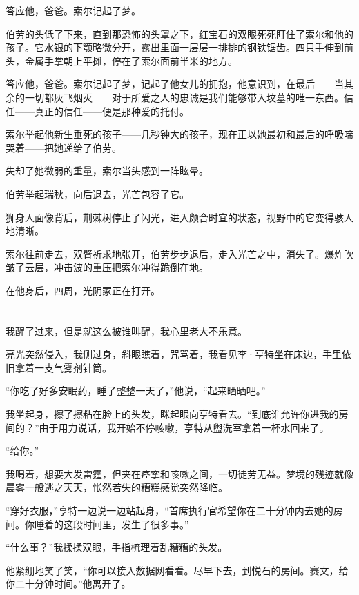\documentclass[AutoFakeBold=true]{book}
\begin{document}
{\kaishu 答应他，爸爸。}索尔记起了梦。

伯劳的头低了下来，直到那恐怖的头罩之下，红宝石的双眼死死盯住了索尔和他的孩子。它水银的下颚略微分开，露出里面一层层一排排的钢铁锯齿。四只手伸到前头，金属手掌朝上平摊，停在了索尔面前半米的地方。

{\kaishu 答应他，爸爸。}索尔记起了梦，记起了他女儿的拥抱，他意识到，在最后——当其余的一切都灰飞烟灭——对于所爱之人的忠诚是我们能够带入坟墓的唯一东西。信任——真正的信任——便是那种爱的托付。

索尔举起他新生垂死的孩子——几秒钟大的孩子，现在正以她最初和最后的呼吸啼哭着——把她递给了伯劳。

失却了她微弱的重量，索尔当头感到一阵眩晕。

伯劳举起瑞秋，向后退去，光芒包容了它。

狮身人面像背后，荆棘树停止了闪光，进入颇合时宜的状态，视野中的它变得骇人地清晰。

索尔往前走去，双臂祈求地张开，伯劳步步退后，走入光芒之中，消失了。爆炸吹皱了云层，冲击波的重压把索尔冲得跪倒在地。

在他身后，四周，光阴冢正在打开。

\part{}

\chapter{}

我醒了过来，但是就这么被谁叫醒，我心里老大不乐意。

亮光突然侵入，我侧过身，斜眼瞧着，咒骂着，我看见李·亨特坐在床边，手里依旧拿着一支气雾剂针筒。

``你吃了好多安眠药，睡了整整一天了，''他说，``起来晒晒吧。''

我坐起身，擦了擦粘在脸上的头发，眯起眼向亨特看去。``到底谁允许你进我的房间的？''由于用力说话，我开始不停咳嗽，亨特从盥洗室拿着一杯水回来了。

``给你。''

我喝着，想要大发雷霆，但夹在痉挛和咳嗽之间，一切徒劳无益。梦境的残迹就像晨雾一般逃之天天，怅然若失的糟糕感觉突然降临。

``穿好衣服，''亨特一边说一边站起身，``首席执行官希望你在二十分钟内去她的房间。你睡着的这段时间里，发生了很多事。''

``什么事？''我揉揉双眼，手指梳理着乱糟糟的头发。

他紧绷地笑了笑，``你可以接入数据网看看。尽早下去，到悦石的房间。赛文，给你二十分钟时间。''他离开了。
\end{document}
